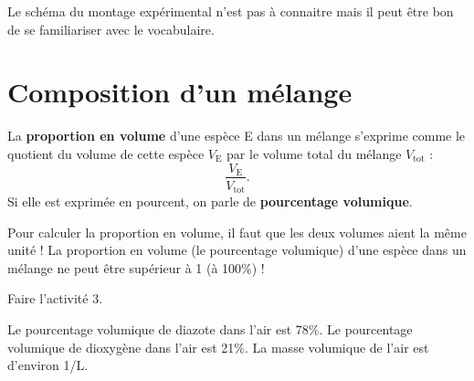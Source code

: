 \documentclass[12pt,a4paper]{article}
\begin{document}
\begin{remarque}
Le schéma du montage expérimental n'est pas à connaitre mais il peut être bon de se familiariser avec le vocabulaire.
\end{remarque}

\section{Composition d'un mélange}

\begin{definition}
La \textbf{proportion en volume} d'une espèce E dans un mélange s'exprime comme le quotient du volume de cette espèce $V_\mathrm{E}$ par le volume total du mélange $V_\mathrm{tot}$ :
\begin{equation}
\frac{V_\mathrm{E}}{V_\mathrm{tot}}.
\nonumber
\end{equation}
Si elle est exprimée en pourcent, on parle de \textbf{pourcentage volumique}.
\end{definition}

\begin{remarque}
Pour calculer la proportion en volume, il faut que les deux volumes aient la même unité !
La proportion en volume (le pourcentage volumique) d'une espèce dans un mélange ne peut être supérieur à 1 (à \unit{100}{\%}) !
\end{remarque}

\begin{conseil}
Faire l'activité 3.
\end{conseil}

\begin{definition}
Le pourcentage volumique de diazote dans l'air est \unit{78}{\%}.
Le pourcentage volumique de dioxygène dans l'air est \unit{21}{\%}.
La masse volumique de l'air est d'environ \unit{1}{\gram/L}.
\end{definition}
\end{document}
